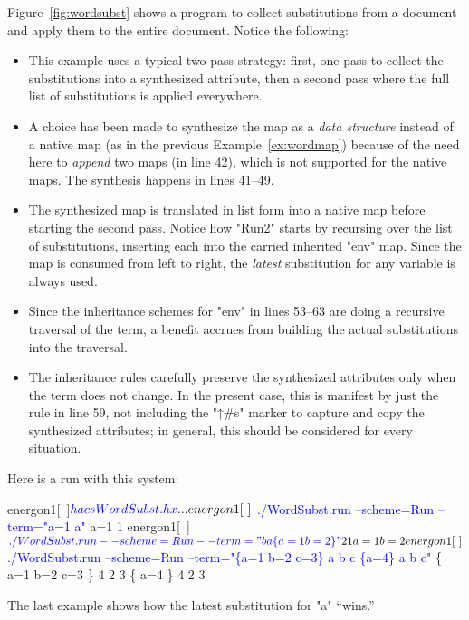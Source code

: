 \documentclass[11pt]{article} %
\begin{document}
\begin{example}
  Figure~\ref{fig:wordsubst} shows a \HAX program to collect substitutions from a document and apply
  them to the entire document.  Notice the following:
  \begin{itemize}

  \item This example uses a typical two-pass strategy: first, one pass to collect the substitutions
    into a synthesized attribute, then a second pass where the full list of substitutions is applied
    everywhere.

  \item A choice has been made to synthesize the map as a \emph{data structure} instead of a native
    \HAX map (as in the previous Example~\ref{ex:wordmap}) because of the need here to \emph{append}
    two maps (in line 42), which is not supported for the native maps.  The synthesis happens in
    lines 41--49.

  \item The synthesized map is translated in list form into a native \HAX map before starting the
    second pass. Notice how "Run2" starts by recursing over the list of substitutions, inserting
    each into the carried inherited "env" map.  Since the map is consumed from left to right, the
    \emph{latest} substitution for any variable is always used.

  \item Since the inheritance schemes for "env" in lines 53--63 are doing a recursive traversal of
    the term, a benefit accrues from building the actual substitutions into the traversal.

  \item The inheritance rules carefully preserve the synthesized attributes only when the term does
    not change. In the present case, this is manifest by just the rule in line 59, not including the
    "↑#s" marker to capture and copy the synthesized attributes; in general, this should be
    considered for every situation.

  \end{itemize}
  Here is a run with this system:
\begin{code}[commandchars=\\\{\}]
energon1[~]$ \textcolor{blue}{hacs WordSubst.hx}
...
energon1[~]$ \textcolor{blue}{./WordSubst.run --scheme=Run --term="a=1 a"}
 a=1  1   
energon1[~]$ \textcolor{blue}{./WordSubst.run --scheme=Run --term="b a \{a=1 b=2\}"}
 2  1   {  a=1  b=2    }     
energon1[~]$ \textcolor{blue}{./WordSubst.run --scheme=Run --term="\{a=1 b=2 c=3\} a b c \{a=4\} a b c"}
  \{  a=1  b=2  c=3     \}   4  2  3   \{  a=4   \}   4  2  3         
\end{code}
  The last example shows how the latest substitution for "a" ``wins.''
\end{example}
\end{document}
